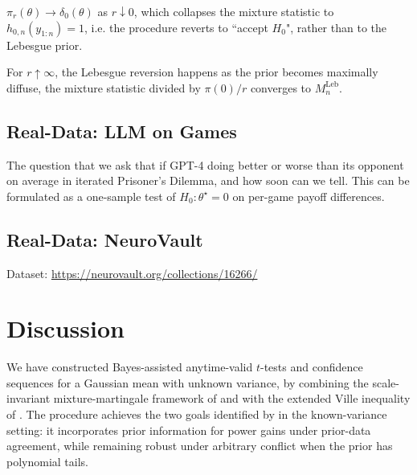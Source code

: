\documentclass{article}%
\newcommand{\Leb}{\mathrm{Leb}}
\begin{document}
$\pi_r(\theta) \to \delta_0 (\theta)$ as $r \downarrow 0$, which collapses the mixture statistic to $h_{0,n}(y_{1:n}) = 1$, i.e. the procedure reverts to ``accept $H_0$", rather than to the Lebesgue prior.

For $r \uparrow \infty$, the Lebesgue reversion happens as the prior becomes maximally diffuse, the mixture statistic divided by $\pi(0)/r$ converges to $M_n^{\Leb}$.


\subsection{Real-Data: LLM on Games}
The question that we ask that if GPT-4 doing better or worse than its opponent on average in iterated Prisoner's Dilemma, and how soon can we tell. This can be formulated as a one-sample test of $H_0: \theta^\star = 0$ on per-game payoff differences.

\subsection{Real-Data: NeuroVault}
\cite{bo2024systems} 
Dataset: \url{https://neurovault.org/collections/16266/}




\section{Discussion}\label{sec:discussion}

We have constructed Bayes-assisted anytime-valid \(t\)-tests and
confidence sequences for a Gaussian mean with unknown variance, by
combining the scale-invariant mixture-martingale framework of
\cite{Lai1976} and \cite{Wang2025} with the extended Ville
inequality of \cite{wang2025extended}. The procedure achieves the two
goals identified by \cite{Cortinovis2025} in the known-variance setting: it incorporates prior information for power gains under prior-data agreement, while remaining robust under arbitrary conflict when the prior has polynomial tails.







\end{document}
